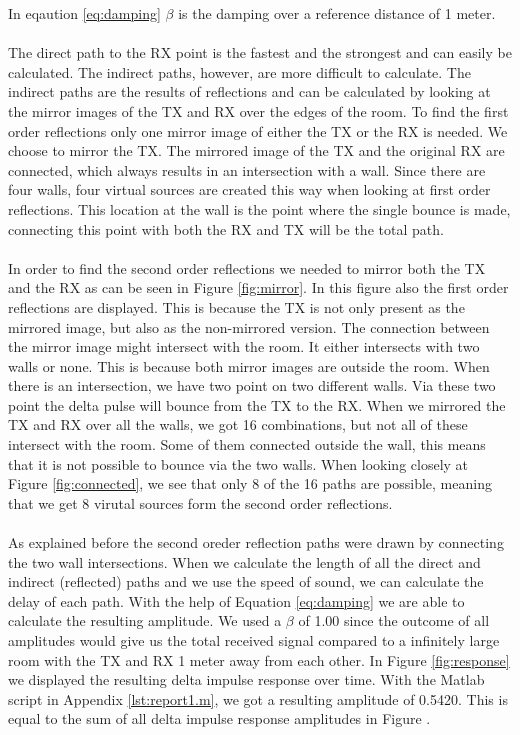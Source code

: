 \documentclass[final]{scrreprt} %
\begin{document}
In eqaution \ref{eq:damping} $\beta$ is the damping over a reference distance of 1 meter. 
\\
\\
The direct path to the RX point is the fastest and the strongest and can easily be calculated.
The indirect paths, however, are more difficult to calculate.
The indirect paths are the results of reflections and can be calculated by looking at the mirror images of the TX and RX over the edges of the room. 
To find the first order reflections only one mirror image of either the TX or the RX is needed. 
We choose to mirror the TX.
The mirrored image of the TX and the original RX are connected, which always results in an intersection with a wall.
Since there are four walls, four virtual sources are created this way when looking at first order reflections.
This location at the wall is the point where the single bounce is made, connecting this point with both the RX and TX will be the total path.
\\ 
\\
In order to find the second order reflections we needed to mirror both the TX and the RX as can be seen in Figure \ref{fig:mirror}.
In this figure also the first order reflections are displayed. 
This is because the TX is not only present as the mirrored image, but also as the non-mirrored version. 
The connection between the mirror image might intersect with the room.
It either intersects with two walls or none. 
This is because both mirror images are outside the room.
When there is an intersection, we have two point on two different walls. 
Via these two point the delta pulse will bounce from the TX to the RX. 
When we mirrored the TX and RX over all the walls, we got 16 combinations, but not all of these intersect with the room. 
Some of them connected outside the wall, this means that it is not possible to bounce via the two walls. 
When looking closely at Figure \ref{fig:connected}, we see that only 8 of the 16 paths are possible, meaning that we get 8 virutal sources form the second order reflections. 
\\ 
\\
As explained before the second oreder reflection paths were drawn by connecting the two wall intersections. 
When we calculate the length of all the direct and indirect (reflected) paths and we use the speed of sound, we can calculate the delay of each path.
With the help of Equation \ref{eq:damping} we are able to calculate the resulting amplitude. 
We used a $\beta$ of 1.00 since the outcome of all amplitudes would give us the total received signal compared to a infinitely large room with the TX and RX 1 meter away from each other.
In Figure \ref{fig:response} we displayed the resulting delta impulse response over time. 
With the Matlab script in Appendix \ref{lst:report1.m}, we got a resulting amplitude of 0.5420. 
This is equal to the sum of all delta impulse response amplitudes in Figure .
\end{document}
